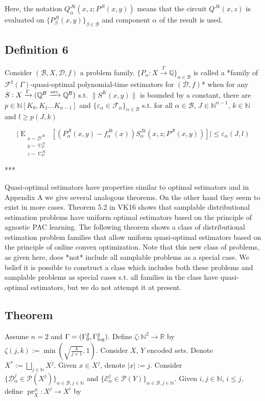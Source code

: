 \documentclass[a4paper]{article}
\newcommand{\EEE}[3]{\operatorname{E}_{\substack{#1 \\ #2 \\ #3}}}
\DeclareMathOperator{\Un}{U}
\DeclareMathOperator{\Prj}{pr}
\newcommand{\Nats}{\mathbb{N}}
\newcommand{\Rats}{\mathbb{Q}}
\newcommand{\Reals}{\mathbb{R}}
\newcommand{\NatPoly}{\Nats[K_0, K_1 \ldots K_{n-1}]}
\newcommand{\Abs}[1]{\lvert #1 \rvert}
\newcommand{\Norm}[1]{\lVert #1 \rVert}
\newcommand{\Dist}{\mathcal{D}}
\newcommand{\Fall}{\mathcal{F}}
\newcommand{\ESG}{\Fall^\sharp(\Gamma)}
\newcommand{\Scheme}{\xrightarrow{\Gamma}}
\newcommand{\ORC}{\xrightarrow{\textnormal{orc}}}
\newcommand{\Base}{\mathcal{B}}
\newcommand{\Prob}{\mathcal{P}}
\newcommand{\GammaLog}{\Gamma_{\textnormal{log}}}
\newcommand{\QBO}{\Rats^\Base \ORC \Rats^\Base}
\begin{document}
Here, the notation ${Q_\alpha^{Jk}(x,z;P^{Jl}(x,y))}$ means that the circuit ${Q^{Jk}(x,z)}$ is evaluated on ${\{P_\beta^{Jl}(x,y)\}_{\beta \in \Base}}$ and component ${\alpha}$ of the result is used.

\subsection{Definition 6}

Consider $(\Base, X, \Dist, f)$ a problem family. ${\{P_\alpha: X \Scheme \Rats\}_{\alpha \in \Base}}$ is called a *family of ${\ESG}$-quasi-optimal polynomial-time estimators for ${(\Dist,f)}$* when for any ${S: X \Scheme (\QBO)}$ s.t. ${\Norm{S^K(x,y)}}$ is bounded by a constant, there are ${p \in \NatPoly}$ and ${\{\varepsilon_\alpha \in \Fall_\alpha\}_{\alpha \in \Base}}$ s.t. for all ${\alpha \in \Base}$, ${J \in \Nats^{n-1}}$, ${k \in \Nats}$ and ${l \geq p(J,k)}$

$$\Abs{\EEE{x \sim \Dist^{Jk}}{y \sim \Un_P^{Jl}}{z \sim \Un_P^{Jk}}[(P_\alpha^{Jl}(x,y)-f_\alpha^{Jk}(x))S_\alpha^{Jk}(x,z;P^{Jl}(x,y))]} \leq \varepsilon_\alpha(J,l)$$

***

Quasi-optimal estimators have properties similar to optimal estimators and in Appendix A we give several analogous theorems. On the other hand they seem to exist in more cases. Theorem 5.2 in VK16 shows that samplable distributional estimation problems have uniform optimal estimators based on the principle of agnostic PAC learning. The following theorem shows a class of distributional estimation problem families that allow uniform quasi-optimal estimators based on the principle of online convex optimization. Note that this new class of problems, as given here, does *not* include all samplable problems as a special case. We belief it is possible to construct a class which includes both these problems and samplable problems as special cases s.t. all families in the class have quasi-optimal estimators, but we do not attempt it at present.

\subsection{Theorem}

Assume ${n=2}$ and ${\Gamma= (\Gamma_0^2, \GammaLog^2)}$. Define ${\zeta: \Nats^2 \rightarrow \Reals}$ by ${\zeta(j,k):=\min(\sqrt{\frac{k}{j+1}},1)}$. Consider ${X}$, ${Y}$ encoded sets. Denote ${X^*:=\bigsqcup_{j \in \Nats} X^j}$. Given ${x \in X^j}$, denote ${\Abs{x}:=j}$. Consider ${\{\Dist_\alpha^j \in \Prob(X^j)\}_{\alpha \in \Base, j \in \Nats}}$ and ${\{\mathcal{E}_\alpha^j \in \Prob(Y)\}_{\alpha \in \Base, j \in \Nats}}$. Given ${i,j \in \Nats}$, ${i \leq j}$, define ${\Prj_X^{ji}: X^j \rightarrow X^i}$ by
\end{document}
